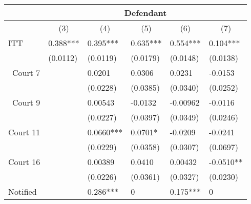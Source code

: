 \begin{tabular}{rrrrrr}
\toprule
\multicolumn{1}{c}{} & \multicolumn{5}{c}{Defendant} \\
\midrule
\multicolumn{1}{c}{} & \multicolumn{1}{c}{(3)} & \multicolumn{1}{c}{(4)} & \multicolumn{1}{c}{(5)} & \multicolumn{1}{c}{(6)} & \multicolumn{1}{c}{(7)} \\
\multicolumn{1}{l}{ITT} & \multicolumn{1}{l}{0.388***} & \multicolumn{1}{l}{0.395***} & \multicolumn{1}{l}{0.635***} & \multicolumn{1}{l}{0.554***} & \multicolumn{1}{l}{0.104***} \\
\multicolumn{1}{l}{} & \multicolumn{1}{l}{(0.0112)} & \multicolumn{1}{l}{(0.0119)} & \multicolumn{1}{l}{(0.0179)} & \multicolumn{1}{l}{(0.0148)} & \multicolumn{1}{l}{(0.0138)} \\
Court 7 & \multicolumn{1}{l}{} & \multicolumn{1}{l}{0.0201} & \multicolumn{1}{l}{0.0306} & \multicolumn{1}{l}{0.0231} & \multicolumn{1}{l}{-0.0153} \\
      & \multicolumn{1}{l}{} & \multicolumn{1}{l}{(0.0228)} & \multicolumn{1}{l}{(0.0385)} & \multicolumn{1}{l}{(0.0340)} & \multicolumn{1}{l}{(0.0252)} \\
Court 9 & \multicolumn{1}{l}{} & \multicolumn{1}{l}{0.00543} & \multicolumn{1}{l}{-0.0132} & \multicolumn{1}{l}{-0.00962} & \multicolumn{1}{l}{-0.0116} \\
      & \multicolumn{1}{l}{} & \multicolumn{1}{l}{(0.0227)} & \multicolumn{1}{l}{(0.0397)} & \multicolumn{1}{l}{(0.0349)} & \multicolumn{1}{l}{(0.0246)} \\
Court 11 & \multicolumn{1}{l}{} & \multicolumn{1}{l}{0.0660***} & \multicolumn{1}{l}{0.0701*} & \multicolumn{1}{l}{-0.0209} & \multicolumn{1}{l}{-0.0241} \\
      & \multicolumn{1}{l}{} & \multicolumn{1}{l}{(0.0229)} & \multicolumn{1}{l}{(0.0358)} & \multicolumn{1}{l}{(0.0307)} & \multicolumn{1}{l}{(0.0697)} \\
Court 16 & \multicolumn{1}{l}{} & \multicolumn{1}{l}{0.00389} & \multicolumn{1}{l}{0.0410} & \multicolumn{1}{l}{0.00432} & \multicolumn{1}{l}{-0.0510**} \\
\multicolumn{1}{l}{} & \multicolumn{1}{l}{} & \multicolumn{1}{l}{(0.0226)} & \multicolumn{1}{l}{(0.0361)} & \multicolumn{1}{l}{(0.0327)} & \multicolumn{1}{l}{(0.0230)} \\
\multicolumn{1}{l}{Notified} & \multicolumn{1}{l}{} & \multicolumn{1}{l}{0.286***} & \multicolumn{1}{l}{0} & \multicolumn{1}{l}{0.175***} & \multicolumn{1}{l}{0} \\

\end{tabular}
